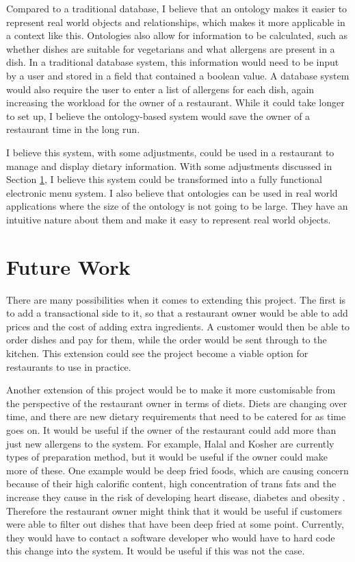 Compared to a traditional database, I believe that an ontology makes it easier to represent real world objects and relationships, which makes it more applicable in a context like this. Ontologies also allow for information to be calculated, such as whether dishes are suitable for vegetarians and what allergens are present in a dish. In a traditional database system, this information would need to be input by a user and stored in a field that contained a boolean value. A database system would also require the user to enter a list of allergens for each dish, again increasing the workload for the owner of a restaurant. While it could take longer to set up, I believe the ontology-based system would save the owner of a restaurant time in the long run.

I believe this system, with some adjustments, could be used in a restaurant to manage and display dietary information. With some adjustments discussed in Section \ref{section:FutureWork}, I believe this system could be transformed into a fully functional electronic menu system. I also believe that ontologies can be used in real world applications where the size of the ontology is not going to be large. They have an intuitive nature about them and make it easy to represent real world objects.

\section{Future Work}
\label{section:FutureWork}

There are many possibilities when it comes to extending this project. The first is to add a transactional side to it, so that a restaurant owner would be able to add prices and the cost of adding extra ingredients. A customer would then be able to order dishes and pay for them, while the order would be sent through to the kitchen. This extension could see the project become a viable option for restaurants to use in practice. 

Another extension of this project would be to make it more customisable from the perspective of the restaurant owner in terms of diets. Diets are changing over time, and there are new dietary requirements that need to be catered for as time goes on. It would be useful if the owner of the restaurant could add more than just new allergens to the system. For example, Halal and Kosher are currently types of preparation method, but it would be useful if the owner could make more of these. One example would be deep fried foods, which are causing concern because of their high calorific content, high concentration of trans fats and the increase they cause in the risk of developing heart disease, diabetes and obesity \cite{deep_fried_mcdonnell_2023}. Therefore the restaurant owner might think that it would be useful if customers were able to filter out dishes that have been deep fried at some point. Currently, they would have to contact a software developer who would have to hard code this change into the system. It would be useful if this was not the case.


